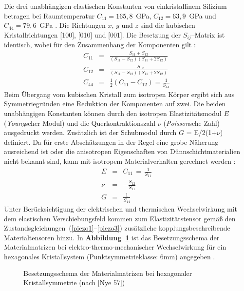 Die drei unabhängigen elastischen Konstanten von einkristallinem
Silizium betragen bei Raumtemperatur $ C_{11} = 165,8$~GPa,
$C_{12} = 63,9$~GPa und $C_{44} = 79,6$~GPa \cite{LB82}.
Die Richtungen $x$, $y$ und $z$ sind die kubischen Kristallrichtungen
[100], [010] und [001].  Die Besetzung der $ S_{ij} $--Matrix
ist identisch, wobei für den Zusammenhang der Komponenten gilt
\cite{Nye57}:
%
\begin{eqnarray}
C_{11} & = & \displaystyle \frac { S_{11}+S_{12} }
             {(S_{11}-S_{12}) (S_{11}+2S_{12})}
             \nonumber \\
C_{12} & = & \displaystyle \frac{-S_{12} }
             {(S_{11}-S_{12}) (S_{11}+2S_{12})} \\
C_{44}           & = & \frac{1}{2} (C_{11} - C_{12})
                  = \displaystyle \frac{1}{ S_{44} } \nonumber
\end{eqnarray}
%
Beim Übergang vom kubischen Kristall zum isotropen Körper ergibt sich
aus Symmetriegründen eine Reduktion der Komponenten auf zwei. Die beiden
unabhängigen Konstanten können durch den isotropen Elastizitätsmodul $E$
({\sl Young}scher Modul) und die Querkontraktionszahl $\nu$
({\sl Poisson}sche Zahl) ausgedrückt werden. Zusätzlich ist der Schubmodul
durch $G$ = E/2(1+$\nu$) definiert. Da für erste Abschätzungen in der Regel
eine grobe Näherung ausreichend ist oder die anisotropen Eigenschaften von
Dünnschichtmaterialien nicht bekannt sind, kann mit isotropem
Materialverhalten gerechnet werden \cite{Heu89}:
%
\begin{eqnarray}
 E   & = & C_{11} \, = \, \frac{1}{S_{11}} \nonumber \\
 \nu & = & - \frac{S_{12}}{S_{11}} \\
 G   & = & \frac{1}{S_{44}} \nonumber
\end{eqnarray}
%
Unter Berücksichtigung der elektrischen und thermischen Wechselwirkung
mit dem elastischen Verschiebungsfeld kommen zum Elastizitätstensor gemäß
den Zustandsgleichungen~(\ref{piezo1}--\ref{piezo3})
zusätzliche kopplungsbeschreibende Materialtensoren hinzu.
In {\bf Abbildung~\ref{abbmatrix6mm}} ist das Besetzungsschema der
Materialmatrizen bei elektro-thermo-mechanischer Wechselwirkung für
ein hexagonales Kristallsystem (Punktsymmetrieklasse: 6mm) angegeben
\cite{Nye57}.
\begin{figure}[htb]
\begin{center}

\setabbzv
\end{center}
\caption{\label{abbmatrix6mm}
 Besetzungsschema der Materialmatrizen bei hexagonaler
 Kristallsymmetrie (nach [Nye 57])}
\end{figure}
